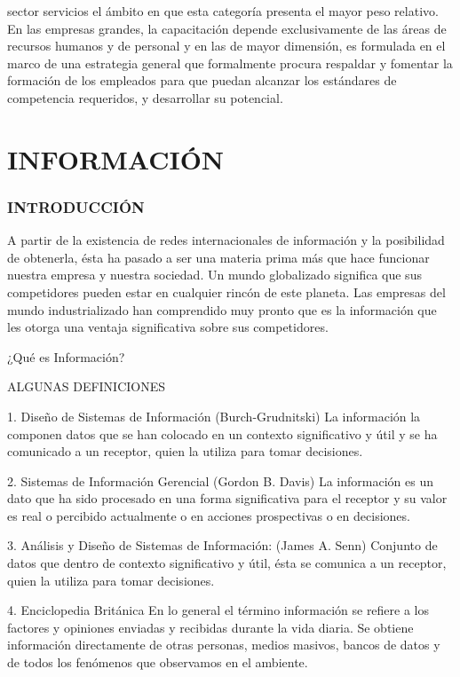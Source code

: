 
sector servicios el ámbito en que esta categoría presenta el mayor peso relativo. En las empresas grandes, la capacitación depende exclusivamente de las áreas de recursos humanos y de personal y en las de mayor dimensión, es formulada en el marco de una estrategia general que formalmente procura respaldar y fomentar la formación de los empleados para que puedan alcanzar los estándares de competencia requeridos, y desarrollar su potencial.

\section*{INFORMACIÓN}
\subsubsection*{INTRODUCCIÓN}
A partir de la existencia de redes internacionales de información y la posibilidad de obtenerla, ésta ha pasado a ser una materia prima más que hace funcionar nuestra empresa y nuestra sociedad. Un mundo globalizado significa que sus competidores pueden estar en cualquier rincón de este planeta. Las empresas del mundo industrializado han comprendido muy pronto que es la información que les otorga una ventaja significativa sobre sus competidores.

¿Qué es Información?

ALGUNAS DEFINICIONES

1. Diseño de Sistemas de Información (Burch-Grudnitski) La información la componen datos que se han colocado en un contexto significativo y útil y se ha comunicado a un receptor, quien la utiliza para tomar decisiones.

2. Sistemas de Información Gerencial (Gordon B. Davis) La información es un dato que ha sido procesado en una forma significativa para el receptor y su valor es real o percibido actualmente o en acciones prospectivas o en decisiones.

3. Análisis y Diseño de Sistemas de Información: (James A. Senn) Conjunto de datos que dentro de contexto significativo y útil, ésta se comunica a un receptor, quien la utiliza para tomar decisiones.

4. Enciclopedia Británica En lo general el término información se refiere a los factores y opiniones enviadas y recibidas durante la vida diaria. Se obtiene información directamente de otras personas, medios masivos, bancos de datos y de todos los fenómenos que observamos en el ambiente.

